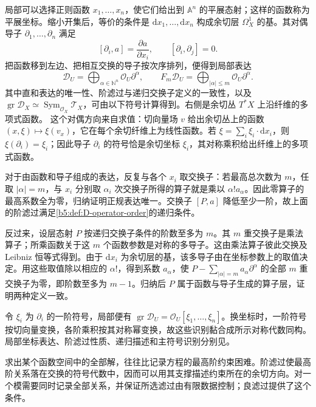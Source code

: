 \ProseParagraphBreak
局部可以选择正则函数 \(x_1,\ldots,x_n\)，使它们给出到 \(\mathbb A^n\) 的平展态射；这样的函数称为平展坐标。缩小开集后，等价的条件是 \(\mathrm{d}x_1,\ldots,\mathrm{d}x_n\) 构成余切层 \(\Omega_X^1\) 的基。其对偶导子 \(\partial_1,\ldots,\partial_n\) 满足
\[
	[\partial_i,a]=\frac{\partial a}{\partial x_i},\qquad [\partial_i,\partial_j]=0.
\]
把函数移到左边、把相互交换的导子按次序排列，便得到局部表达
\[
	\mathcal D_U=\bigoplus_{\alpha\in\mathbb N^n}\mathcal O_U\partial^\alpha, \qquad F_m\mathcal D_U=\bigoplus_{|\alpha|\le m}\mathcal O_U\partial^\alpha.
\]
其中直和表达的唯一性、阶滤过与递归交换子定义的一致性，以及 \(\operatorname{gr}\mathcal D_X\simeq\operatorname{Sym}_{\mathcal O_X}\mathcal T_X\)，可由以下符号计算得到。右侧是余切丛 \(T^*X\) 上沿纤维的多项式函数。 这个对偶方向来自求值：切向量场 \(v\) 给出余切丛上的函数 \((x,\xi)\mapsto\xi(v_x)\)，它在每个余切纤维上为线性函数。若 \(\xi=\sum_i\xi_i\cdot\mathrm{d}x_i\)，则 \(\xi(\partial_i)=\xi_i\)；因此导子 \(\partial_i\) 的符号恰是余切坐标 \(\xi_i\)，其对称乘积给出纤维上的多项式函数。
\begin{proofsketch}
	对于由函数和导子组成的表达，反复与各个 \(x_i\) 取交换子：若最高总次数为 \(m\)，任取 \(|\alpha|=m\)，与 \(x_i\) 分别取 \(\alpha_i\) 次交换子所得的算子就是乘以 \(\alpha!a_\alpha\)。因此零算子的最高系数全为零，归纳证明正规表达唯一。交换子 \([P,a]\) 降低至少一阶，故上面的阶滤过满足\cref{b5:def:D-operator-order}的递归条件。

	反过来，设层态射 \(P\) 按递归交换子条件的阶数至多为 \(m\)。其 \(m\) 重交换子是乘法算子；所乘函数关于这 \(m\) 个函数参数是对称的多导子。这由乘法算子彼此交换及 Leibniz 恒等式得到。由于 \(\mathrm{d}x_i\) 为余切层的基，该多导子由在坐标参数上的取值决定。用这些取值除以相应的 \(\alpha!\)，得到系数 \(a_\alpha\)，使 \(P-\sum_{|\alpha|=m}a_\alpha\partial^\alpha\) 的全部 \(m\) 重交换子为零，即阶数至多为 \(m-1\)。归纳后 \(P\) 属于函数与导子生成的算子层，证明两种定义一致。

	令 \(\xi_i\) 为 \(\partial_i\) 的一阶符号，局部便有 \(\operatorname{gr}\mathcal D_U=\mathcal O_U[\xi_1,\ldots,\xi_n]\)。换坐标时，一阶符号按切向量变换，各阶乘积按其对称幂变换，故这些识别黏合成所示对称代数同构。局部坐标表达、阶滤过性质、递归描述和主符号识别分别见\cite[Section 1.1, Proposition 1.1.3, Exercise 1.1.4 and the principal-symbol discussion, pp. 15--17]{HottaTakeuchiTanisaki2008DModules}。
\end{proofsketch}

求出某个函数空间中的全部解，往往比记录方程的最高阶约束困难。阶滤过使最高阶关系落在交换的符号代数中，因而可以用其支撑描述约束所在的余切方向。对一个模需要同时记录全部关系，并保证所选滤过由有限数据控制；良滤过提供了这个条件。

